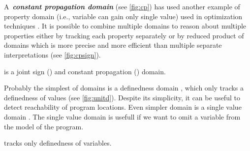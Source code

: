 A~\textbf{\emph{constant propagation domain}}  (see
\autoref{fig:cp}) has used another example of property domain (i.e., variable
can gain only single value) used in optimization techniques \cite{Kildall1973}.
It is possible to combine multiple domains to reason about multiple properties
either by tracking each property separately or by reduced product of domains
which is more precise and more efficient than multiple separate interpretations
\cite{Cousot2011b} (see \autoref{fig:cpsign}).  
\begin{marginfigure}%
    \centering
{}
    \caption{ is a joint sign () and constant propagation () domain.}
    \label{fig:cpsign}%
\end{marginfigure}%

Probably the simplest of domains is a definedness domain , which only
tracks a definedness of values (see \autoref{fig:unitd}). Despite its
simplicity, it can be useful to detect reachability of program locations. Even
simpler domain is a single value domain . The single value domain is
usefull if we want to omit a variable from the model of the program.

\begin{marginfigure}%
    \centering
    \caption{ tracks only definedness of variables.}
    \label{fig:unitd}%
\end{marginfigure}%

